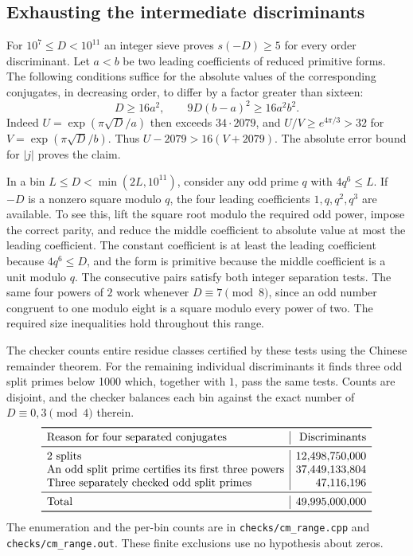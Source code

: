 \subsection{Exhausting the intermediate discriminants}
For $10^7\le D<10^{11}$ an integer sieve proves $s(-D)\ge5$ for every order discriminant. Let $a<b$ be two leading coefficients of reduced primitive forms. The following conditions suffice for the absolute values of the corresponding conjugates, in decreasing order, to differ by a factor greater than sixteen:
\[
       D\ge16a^2,\qquad 9D(b-a)^2\ge16a^2b^2.
\]
Indeed $U=\exp(\pi\sqrt D/a)$ then exceeds $34\cdot2079$, and
$U/V\ge e^{4\pi/3}>32$ for $V=\exp(\pi\sqrt D/b)$. Thus
$U-2079>16(V+2079)$. The absolute error bound for $|j|$ proves the claim.

In a bin $L\le D<\min(2L,10^{11})$, consider any odd prime $q$ with $4q^6\le L$. If $-D$ is a nonzero square modulo $q$, the four leading coefficients $1,q,q^2,q^3$ are available. To see this, lift the square root modulo the required odd power, impose the correct parity, and reduce the middle coefficient to absolute value at most the leading coefficient. The constant coefficient is at least the leading coefficient because $4q^6\le D$, and the form is primitive because the middle coefficient is a unit modulo $q$. The consecutive pairs satisfy both integer separation tests. The same four powers of $2$ work whenever $D\equiv7\pmod8$, since an odd number congruent to one modulo eight is a square modulo every power of two. The required size inequalities hold throughout this range.

The checker counts entire residue classes certified by these tests using the Chinese remainder theorem. For the remaining individual discriminants it finds three odd split primes below 1000 which, together with $1$, pass the same tests. Counts are disjoint, and the checker balances each bin against the exact number of $D\equiv0,3\pmod4$ therein.
\[
\begin{array}{l|r}
\toprule
\text{Reason for four separated conjugates}&\text{Discriminants}\\ \midrule
2\text{ splits}&12{,}498{,}750{,}000\\
\text{An odd split prime certifies its first three powers}&37{,}449{,}133{,}804\\
\text{Three separately checked odd split primes}&47{,}116{,}196\\ \midrule
\text{Total}&49{,}995{,}000{,}000\\
\bottomrule
\end{array}
\]
The enumeration and the per-bin counts are in \texttt{checks/cm\_range.cpp} and \texttt{checks/cm\_range.out}. These finite exclusions use no hypothesis about zeros.
